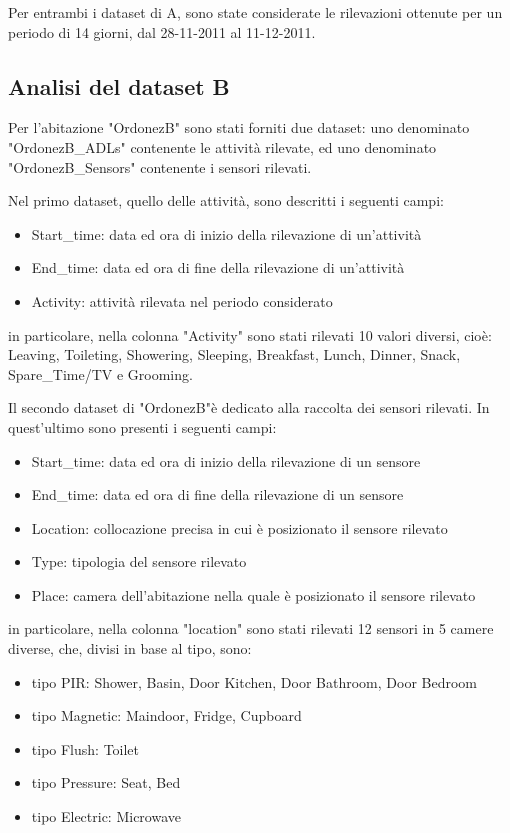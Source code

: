 \documentclass[10pt,a4paper]{article}
\begin{document}
Per entrambi i dataset di A, sono state considerate le rilevazioni ottenute per un periodo di 14 giorni, dal 28-11-2011 al 11-12-2011.

\subsection{Analisi del dataset B}

Per l'abitazione "OrdonezB" sono stati forniti due dataset: uno denominato "OrdonezB\_ADLs" contenente le attività rilevate, ed uno denominato  "OrdonezB\_Sensors"	 contenente i sensori rilevati.

Nel primo dataset, quello delle attività, sono descritti i seguenti campi:

\begin{itemize}
	\item Start\_time: data ed ora di inizio della rilevazione di un'attività
	\item End\_time: data ed ora di fine della rilevazione di un'attività
	\item  Activity: attività rilevata nel periodo considerato
\end{itemize}

in particolare, nella colonna "Activity" sono stati rilevati 10 valori diversi, cioè: Leaving, Toileting, Showering, Sleeping, Breakfast, Lunch, Dinner, Snack, Spare\_Time/TV e Grooming. 

Il secondo dataset di "OrdonezB"è dedicato alla raccolta dei sensori rilevati. In quest'ultimo sono presenti i seguenti campi:
\begin{itemize}
	\item Start\_time: data ed ora di inizio della rilevazione di un sensore
	\item End\_time: data ed ora di fine della rilevazione di un sensore
	\item  Location: collocazione precisa in cui è posizionato il sensore rilevato
	\item Type: tipologia del sensore rilevato
	\item Place: camera dell'abitazione nella quale è posizionato il sensore rilevato
\end{itemize}

in particolare, nella colonna "location" sono stati rilevati 12 sensori in 5 camere diverse, che, divisi in base al tipo, sono:

\begin{itemize}
	\item tipo PIR: Shower, Basin, Door Kitchen, Door Bathroom, Door Bedroom
	\item tipo Magnetic: Maindoor, Fridge, Cupboard
	\item  tipo Flush: Toilet
	\item tipo Pressure: Seat, Bed
	\item tipo Electric: Microwave
\end{itemize}
\end{document}
